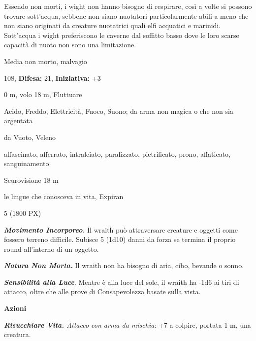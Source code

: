\begin{multicols}{2}
{Essendo non morti, i wight non hanno bisogno di respirare, così a volte si possono trovare sott'acqua, sebbene non siano nuotatori particolarmente abili a meno che non siano originati da creature nuotatrici quali elfi acquatici e marinidi. Sott'acqua i wight preferiscono le caverne dal soffitto basso dove le loro scarse capacità di nuoto non sono una limitazione.

\noindent
\begin{description}[noitemsep, topsep=0pt, parsep=0pt, partopsep=0pt, leftmargin=0cm, labelwidth=2.2cm]
	\item[\textbf{Taglia/Tipo:}] Media non morto, malvagio
	\item[\textbf{Caratt.:}] 
	\item[\textbf{Punti Ferita:}] 108,  \textbf{Difesa:} 21,  \textbf{Iniziativa:} +3
	\item[\textbf{Movimento:}] 0 m, volo 18 m, Fluttuare
	\item[\textbf{Tiri Salvez.:}] 
	\item[\textbf{Res. Danni:}] Acido, Freddo, Elettricità, Fuoco, Suono; da arma non magica o che non sia argentata
	\item[\textbf{Imm. Danni:}] da Vuoto, Veleno
	\item[\textbf{Immunità:}] affascinato, afferrato, intralciato, paralizzato, pietrificato, prono, affaticato, sanguinamento
	\item[\textbf{Sensi:}] Scurovisione 18 m
	\item[\textbf{Linguaggi:}] le lingue che conosceva in vita, Expiran
	\item[\textbf{Sfida:}] 5 (1800 PX)\smallskip
\end{description}

\emph{\textbf{Movimento Incorporeo.}} Il wraith può attraversare creature e oggetti come fossero terreno difficile. Subisce 5 (1d10) danni da forza se termina il proprio round all'interno di un oggetto.

\emph{\textbf{Natura Non Morta.}} Il wraith non ha bisogno di aria, cibo, bevande o sonno.

\emph{\textbf{Sensibilità alla Luce}}. Mentre è alla luce del sole, il wraith ha -1d6 ai tiri di attacco, oltre che alle prove di Consapevolezza basate sulla vista.

\textbf{Azioni}

\emph{\textbf{Risucchiare Vita.} Attacco con arma da mischia}: +7 a colpire, portata 1 m, una creatura.

}
\end{multicols}
